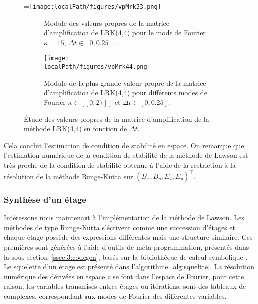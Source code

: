 \begin{figure}[h]
  \centering
  =\hbox{\texttt{[image: \\localPath/figures/vpMrk33.png]}}
  \begin{subfigure}[b]{.45\linewidth}
    \caption{Module des valeurs propres de la matrice d'amplification de LRK(4,4) pour le mode de Fourier $\kappa=15$, $\Delta t\in[0,0.25]$.\\ }
    \label{fig:3:vpMrk44_k15}
  \end{subfigure}
  \begin{subfigure}[b]{.45\linewidth}
    \texttt{[image: \\localPath/figures/vpMrk44.png]}
    \caption{Module de la plus grande valeur propre de la matrice d'amplification de LRK(4,4) pour différents modes de Fourier $\kappa\in[\![0,27]\!]$ et $\Delta t\in[0,0.25]$.}
    \label{fig:3:vpMrk44}
  \end{subfigure}
  \caption{Étude des valeurs propres de la matrice d'amplification de la méthode LRK(4,4) en fonction de $\Delta t$.}
  \label{fig:3:vplrk44}
\end{figure}

Cela conclut l'estimation de condition de stabilité en espace. On remarque que l'estimation numérique de la condition de stabilité de la méthode de Lawson est très proche de la condition de stabilité obtenue à l'aide de la restriction à la résolution de la méthode Runge-Kutta sur $(B_x,B_y,E_x,E_y)^\top$.


\subsubsection{Synthèse d'un étage}
\label{ssec:3:stage}

Intéressons nous maintenant à l'implémentation de la méthode de Lawson. Les méthodes de type Runge-Kutta s'écrivent comme une succession d'étages et chaque étage possède des expressions différentes mais une structure similaire. Ces premières sont générées à l'aide d'outils de méta-programmation, présentés dans la sous-section~\ref{ssec:3:codegen}, basés sur la bibliothèque \Python{} de calcul symbolique \sympy{}. Le squelette d'un étage est présenté dans l'algorithme~\ref{alg:squeltte}. La résolution numérique des dérivées en espace $z$ se font dans l'espace de Fourier, pour cette raison, les variables transmises entres étages ou itérations, sont des tableaux de complexes, correspondant aux modes de Fourier des différentes variables.

